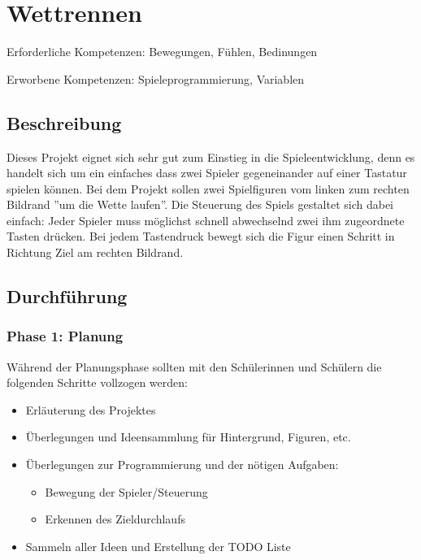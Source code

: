\section{Wettrennen}\label{wettrennen}

Erforderliche Kompetenzen: Bewegungen, Fühlen, Bedinungen

Erworbene Kompetenzen: Spieleprogrammierung, Variablen

\begin{figure}[ht]
    \centering 
    \caption[\Sectionname]{\Sectionname}
\end{figure}

\subsection{Beschreibung}\label{beschreibung}

Dieses Projekt eignet sich sehr gut zum Einstieg in die
Spieleentwicklung, denn es handelt sich um ein einfaches dass zwei
Spieler gegeneinander auf einer Tastatur spielen können. Bei dem Projekt
sollen zwei Spielfiguren vom linken zum rechten Bildrand ''um die Wette
laufen''. Die Steuerung des Spiels gestaltet sich dabei einfach: Jeder
Spieler muss möglichst schnell abwechselnd zwei ihm zugeordnete Tasten
drücken. Bei jedem Tastendruck bewegt sich die Figur einen Schritt in
Richtung Ziel am rechten Bildrand.

\subsection{Durchführung}\label{durchfuxfchrung}

\subsubsection{Phase 1: Planung}\label{phase-1-planung}

Während der Planungsphase sollten mit den Schülerinnen und Schülern die
folgenden Schritte vollzogen werden:

\begin{itemize}
\item
  Erläuterung des Projektes
\item
  Überlegungen und Ideensammlung für Hintergrund, Figuren, etc.
\item
  Überlegungen zur Programmierung und der nötigen Aufgaben:

  \begin{itemize}
  \item
    Bewegung der Spieler/Steuerung
  \item
    Erkennen des Zieldurchlaufs
  \end{itemize}
\item
  Sammeln aller Ideen und Erstellung der TODO Liste
\end{itemize}

